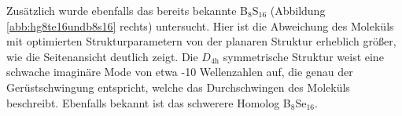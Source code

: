 Zusätzlich wurde ebenfalls das bereits bekannte B$_8$S$_{16}$\supercite{krebs1980b8s16} (Abbildung \ref{abb:hg8te16undb8s16} rechts) untersucht. Hier ist die Abweichung des Moleküls mit optimierten Strukturparametern von der planaren Struktur erheblich größer, wie die Seitenansicht deutlich zeigt. Die $D_{4\textrm{h}}$ symmetrische Struktur weist eine schwache imaginäre Mode von etwa -10 Wellenzahlen auf, die genau der Gerüstschwingung entspricht, welche das Durchschwingen des Moleküls beschreibt. Ebenfalls bekannt ist das schwerere Homolog B$_8$Se$_{16}$.

